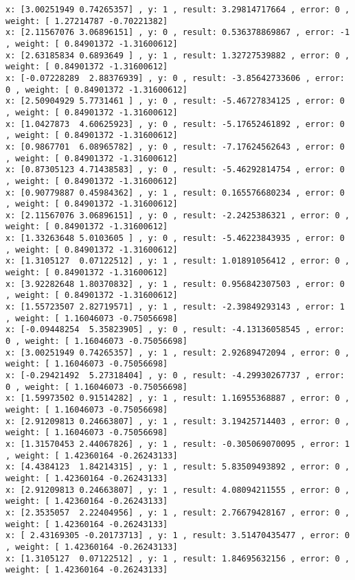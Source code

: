 \documentclass[11pt]{article}
\begin{document}
\begin{Verbatim}[commandchars=\\\{\}]
x: [3.00251949 0.74265357] , y: 1 , result: 3.29814717664 , error: 0 , weight: [ 1.27214787 -0.70221382]
x: [2.11567076 3.06896151] , y: 0 , result: 0.536378869867 , error: -1 , weight: [ 0.84901372 -1.31600612]
x: [2.63185834 0.6893649 ] , y: 1 , result: 1.32727539882 , error: 0 , weight: [ 0.84901372 -1.31600612]
x: [-0.07228289  2.88376939] , y: 0 , result: -3.85642733606 , error: 0 , weight: [ 0.84901372 -1.31600612]
x: [2.50904929 5.7731461 ] , y: 0 , result: -5.46727834125 , error: 0 , weight: [ 0.84901372 -1.31600612]
x: [1.0427873  4.60625923] , y: 0 , result: -5.17652461892 , error: 0 , weight: [ 0.84901372 -1.31600612]
x: [0.9867701  6.08965782] , y: 0 , result: -7.17624562643 , error: 0 , weight: [ 0.84901372 -1.31600612]
x: [0.87305123 4.71438583] , y: 0 , result: -5.46292814754 , error: 0 , weight: [ 0.84901372 -1.31600612]
x: [0.90779887 0.45984362] , y: 1 , result: 0.165576680234 , error: 0 , weight: [ 0.84901372 -1.31600612]
x: [2.11567076 3.06896151] , y: 0 , result: -2.2425386321 , error: 0 , weight: [ 0.84901372 -1.31600612]
x: [1.33263648 5.0103605 ] , y: 0 , result: -5.46223843935 , error: 0 , weight: [ 0.84901372 -1.31600612]
x: [1.3105127  0.07122512] , y: 1 , result: 1.01891056412 , error: 0 , weight: [ 0.84901372 -1.31600612]
x: [3.92282648 1.80370832] , y: 1 , result: 0.956842307503 , error: 0 , weight: [ 0.84901372 -1.31600612]
x: [1.55723507 2.82719571] , y: 1 , result: -2.39849293143 , error: 1 , weight: [ 1.16046073 -0.75056698]
x: [-0.09448254  5.35823905] , y: 0 , result: -4.13136058545 , error: 0 , weight: [ 1.16046073 -0.75056698]
x: [3.00251949 0.74265357] , y: 1 , result: 2.92689472094 , error: 0 , weight: [ 1.16046073 -0.75056698]
x: [-0.29421492  5.27318404] , y: 0 , result: -4.29930267737 , error: 0 , weight: [ 1.16046073 -0.75056698]
x: [1.59973502 0.91514282] , y: 1 , result: 1.16955368887 , error: 0 , weight: [ 1.16046073 -0.75056698]
x: [2.91209813 0.24663807] , y: 1 , result: 3.19425714403 , error: 0 , weight: [ 1.16046073 -0.75056698]
x: [1.31570453 2.44067826] , y: 1 , result: -0.305069070095 , error: 1 , weight: [ 1.42360164 -0.26243133]
x: [4.4384123  1.84214315] , y: 1 , result: 5.83509493892 , error: 0 , weight: [ 1.42360164 -0.26243133]
x: [2.91209813 0.24663807] , y: 1 , result: 4.08094211555 , error: 0 , weight: [ 1.42360164 -0.26243133]
x: [2.3535057  2.22404956] , y: 1 , result: 2.76679428167 , error: 0 , weight: [ 1.42360164 -0.26243133]
x: [ 2.43169305 -0.20173713] , y: 1 , result: 3.51470435477 , error: 0 , weight: [ 1.42360164 -0.26243133]
x: [1.3105127  0.07122512] , y: 1 , result: 1.84695632156 , error: 0 , weight: [ 1.42360164 -0.26243133]

\end{Verbatim}
\end{document}
